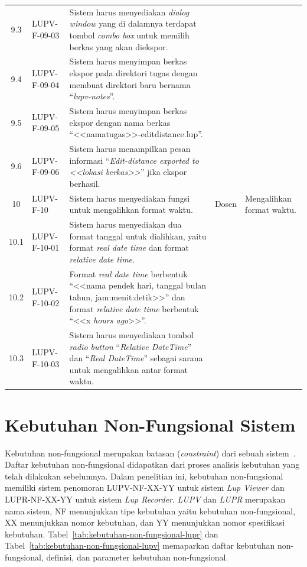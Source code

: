 {\begin{longtable}{|c|L{2.5cm}|L{5cm}|L{1.8cm}|L{2.1cm}|}
    9.3 & LUPV-F-09-03 & Sistem harus menyediakan \emph{dialog window} yang di
                         dalamnya terdapat tombol \emph{combo box} untuk memilih berkas
                         yang akan diekspor. & & \\
    9.4 & LUPV-F-09-04 & Sistem harus menyimpan berkas ekspor pada direktori
                         tugas dengan membuat direktori baru bernama
                         ``\emph{lupv-notes}''. & & \\
    9.5 & LUPV-F-09-05 & Sistem harus menyimpan berkas ekspor dengan nama berkas
                         ``<<namatugas>>-editdistance.lup''. & & \\
    9.6 & LUPV-F-09-06 & Sistem harus menampilkan pesan informasi ``\emph{Edit-distance exported
                         to <<lokasi berkas>>}'' jika ekspor berhasil. & & \\\hline
    10 & LUPV-F-10 & Sistem harus menyediakan fungsi untuk mengalihkan
                     format waktu.  & Dosen & Mengalihkan format waktu. \\
    10.1 & LUPV-F-10-01 & Sistem harus menyediakan dua format tanggal
                         untuk dialihkan, yaitu format \emph{real date
                         time} dan format \emph{relative date
                         time}. & & \\
    10.2 & LUPV-F-10-02 & Format \emph{real date time} berbentuk
                         ``<<nama pendek hari, tanggal bulan tahun,
                         jam:menit:detik>>'' dan format \emph{relative
                         date time} berbentuk ``<<x \emph{hours ago}>>''. &  &\\
    10.3 & LUPV-F-10-03 & Sistem harus menyediakan tombol \emph{radio
                         button} ``\emph{Relative DateTime}'' dan
                          ``\emph{Real DateTime}'' sebagai sarana untuk mengalihkan
                         antar format waktu. & & \\\hline

  \end{longtable}
}

\section{Kebutuhan Non-Fungsional Sistem}

Kebutuhan non-fungsional merupakan batasan (\emph{constraint}) dari
sebuah sistem~\parencite{sommerville2016software}. Daftar kebutuhan
non-fungsional didapatkan dari proses analisis kebutuhan yang telah
dilakukan sebelumnya. Dalam penelitian ini, kebutuhan non-fungsional
memiliki sistem penomoran LUPV-NF-XX-YY untuk sistem \emph{Lup Viewer}
dan LUPR-NF-XX-YY untuk sistem \emph{Lup Recorder}. \emph{LUPV} dan
\emph{LUPR} merupakan nama sistem, NF menunjukkan tipe kebutuhan yaitu
kebutuhan non-fungsional, XX menunjukkan nomor kebutuhan, dan YY
menunjukkan nomor spesifikasi
kebutuhan. Tabel~\ref{tab:kebutuhan-non-fungsional-lupr} dan
Tabel~\ref{tab:kebutuhan-non-fungsional-lupv} memaparkan daftar
kebutuhan non-fungsional, definisi, dan parameter kebutuhan
non-fungsional.

